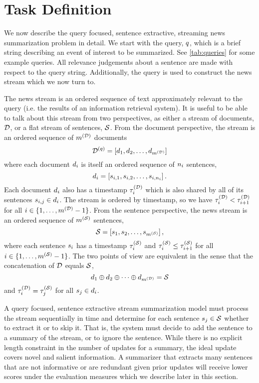\section{Task Definition}
\label{sec:strmsumProbDef}

We now describe the query focused, sentence extractive, streaming news
summarization problem in detail.  We start with the query, $q$, which is a
brief string describing an event of interest to be summarized. See
\autoref{tab:queries} for some example queries. All relevance judgements about
a sentence are made with respect to the query string.  Additionally, the query
is used to construct the news stream which we now turn to.



The news stream is an ordered sequence of text approximately relevant to the
query (i.e. the results of an information retrieval system). It is useful to be
able to talk about this stream from two perspectives, as either a stream of
documents, $\mathcal{D}$, or a flat stream of sentences, $\mathcal{S}$.  From
the document perspective, the stream is an ordered sequence of ${m^{(\mathcal{D})}}$
documents  
\[ 
  \mathcal{D}^{(q)} = \left[ 
              d_1,d_2, \ldots, d_{{m^{(\mathcal{D})}}}
  \right] 
\] 
where each document $d_i$ is itself an ordered sequence of $n_i$
sentences, 
\[ 
    d_i = \left[ 
        s_{i,1}, s_{i,2}, \ldots, s_{i,n_i}  
    \right].  
\] 
Each document $d_i$ also has a timestamp $\tau^{(\mathcal{D})}_i$ which is also shared by
all of its sentences $s_{i,j}  \in d_i$.  The stream is ordered by
timestamp, so we have $\tau^{(\mathcal{D})}_i < \tau^{(\mathcal{D})}_{i+1}$ for all $i \in \{1,\ldots,
{m^{(\mathcal{D})}} -1\}$. From the sentence perspective, the news stream is an ordered
sequence of ${m^{(\mathcal{S})}}$ sentences, 
\[
    \mathcal{S} = \left[ s_1, s_2, \ldots, s_{{m^{(\mathcal{S})}}} \right], 
\] 
where each sentence $s_i$ has a timestamp $\tau^{(\mathcal{S})}_i$ and $\tau^{(\mathcal{S})}_i \le
\tau^{(\mathcal{S})}_{i+1}$ for all $i \in \{1,\ldots,{m^{(\mathcal{S})}} - 1\}$.  The two points of
view are equivalent in the sense that the concatenation of $\mathcal{D}$ equals
$\mathcal{S}$, 
\[  d_1 \oplus d_2 \oplus \cdots \oplus d_{{m^{(\mathcal{D})}}} = \mathcal{S} 
\] 
and $\tau^{(\mathcal{D})}_i = \tau^{(\mathcal{S})}_j$ for all $s_j \in d_i$.

A query focused, sentence extractive stream summarization model must process
the stream sequentially in time and determine for each sentence $s_j \in
\mathcal{S}$ whether to extract it or to skip it. That is, the system must
decide to add the sentence to a summary of the stream, or to ignore the
sentence.  While there is no explicit length constraint in the number of
updates for a summary, the ideal update covers novel and salient information.
A summarizer that extracts many sentences that are not informative or are
redundant given prior updates will receive lower scores under the evaluation
measures which we describe later in this section.

